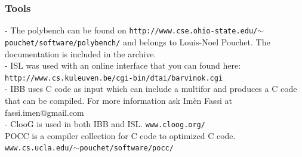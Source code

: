 \documentclass{beamer}
\begin{document}
\begin{frame}
\frametitle{Tools}

- The polybench can be found on \texttt{http://www.cse.ohio-state.edu/$\sim$pouchet/software/polybench/} and belongs to Louis-Noel Pouchet. The documentation is included in the archive. \\
- ISL was used with an online interface that you can found here: \texttt{http://www.cs.kuleuven.be/cgi-bin/dtai/barvinok.cgi} \\
- IBB uses C code as input which can include a multifor and produces a C code that can be compiled. For more information ask Imèn Fassi at fassi.imen@gmail.com \\
- ClooG is used in both IBB and ISL. \texttt{www.cloog.org/} \\
POCC is a compiler collection for C code to optimized C code. \texttt{www.cs.ucla.edu/$\sim$pouchet/software/pocc/} \\

\end{frame}
\end{document}
